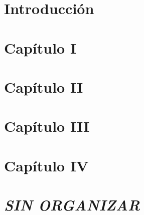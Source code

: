 \documentclass[a4paper,12pt,titlepage]{article}
\begin{document}
  \thispagestyle{empty} %
  \caratula
  \newpage

  \newpage

  \setcounter{secnumdepth}{0}
  \setcounter{tocdepth}{3}
  \setcounter{page}{1}
  
  \newpage
  \tableofcontents
  \newpage

  \section{Introducción}
  
  \newpage
  \setcounter{secnumdepth}{3}
  \section{Capítulo I}
  
  \newpage
  
  \newpage
  \section{Capítulo II}
  
  \newpage
  \section{Capítulo III}
  
  \newpage
  \section{Capítulo IV}
  
  \newpage

  \section{\textit{SIN ORGANIZAR}}
  
  \newpage

  \appendix
  \newpage
  
  \newpage
  
  
  \newpage
  \printglossary[title={Glosario de términos}]
  \newpage
  \listoffigures
  \newpage
  \listoftables
\end{document}
